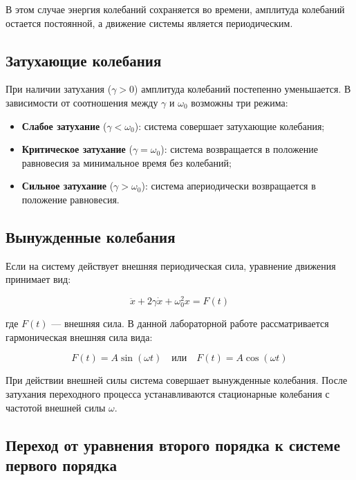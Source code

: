 \documentclass[
  12pt,
  a4paper,
  DIV=11,
  numbers=noendperiod]{scrreprt}
\providecommand{\tightlist}{%
  \setlength{\itemsep}{0pt}\setlength{\parskip}{0pt}}\usepackage{longtable,booktabs,array}
\begin{document}
В этом случае энергия колебаний сохраняется во времени, амплитуда
колебаний остается постоянной, а движение системы является
периодическим.

\subsection{Затухающие
колебания}\label{ux437ux430ux442ux443ux445ux430ux44eux449ux438ux435-ux43aux43eux43bux435ux431ux430ux43dux438ux44f}

При наличии затухания (\(\gamma > 0\)) амплитуда колебаний постепенно
уменьшается. В зависимости от соотношения между \(\gamma\) и
\(\omega_0\) возможны три режима:

\begin{itemize}
\tightlist
\item
  \textbf{Слабое затухание} (\(\gamma < \omega_0\)): система совершает
  затухающие колебания;
\item
  \textbf{Критическое затухание} (\(\gamma = \omega_0\)): система
  возвращается в положение равновесия за минимальное время без
  колебаний;
\item
  \textbf{Сильное затухание} (\(\gamma > \omega_0\)): система
  апериодически возвращается в положение равновесия.
\end{itemize}

\subsection{Вынужденные
колебания}\label{ux432ux44bux43dux443ux436ux434ux435ux43dux43dux44bux435-ux43aux43eux43bux435ux431ux430ux43dux438ux44f}

Если на систему действует внешняя периодическая сила, уравнение движения
принимает вид:

\[
\ddot{x} + 2\gamma \dot{x} + \omega_0^2 x = F(t) \tag{3}
\]

где \(F(t)\) --- внешняя сила. В данной лабораторной работе
рассматривается гармоническая внешняя сила вида:

\[
F(t) = A \sin(\omega t) \quad \text{или} \quad F(t) = A \cos(\omega t)
\]

При действии внешней силы система совершает вынужденные колебания. После
затухания переходного процесса устанавливаются стационарные колебания с
частотой внешней силы \(\omega\).

\subsection{Переход от уравнения второго порядка к системе первого
порядка}\label{ux43fux435ux440ux435ux445ux43eux434-ux43eux442-ux443ux440ux430ux432ux43dux435ux43dux438ux44f-ux432ux442ux43eux440ux43eux433ux43e-ux43fux43eux440ux44fux434ux43aux430-ux43a-ux441ux438ux441ux442ux435ux43cux435-ux43fux435ux440ux432ux43eux433ux43e-ux43fux43eux440ux44fux434ux43aux430}
\end{document}
